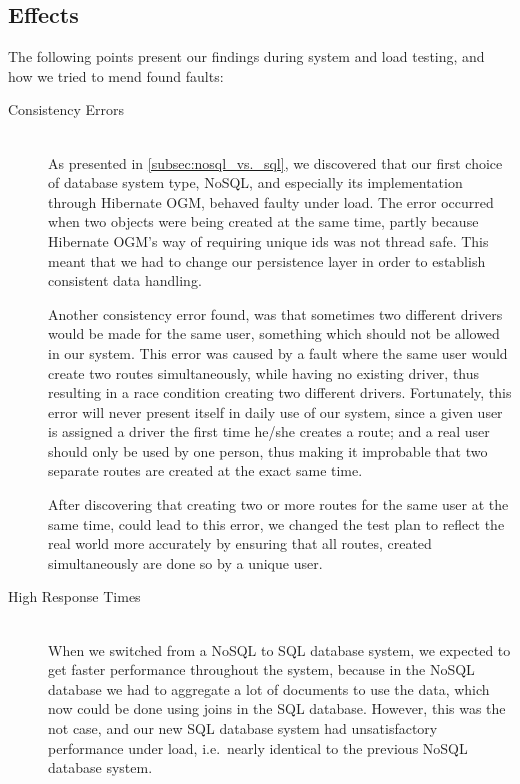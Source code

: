 \subsection{Effects}
The following points present our findings during system and load testing, and how we tried to mend found faults:
\begin{description}
    \item[Consistency Errors]\hfill \\
        As presented in \cref{subsec:nosql_vs._sql}, we discovered that our first choice of database system type, NoSQL, and especially its implementation through Hibernate OGM, behaved faulty under load.
        The error occurred when two objects were being created at the same time, partly because Hibernate OGM's way of requiring unique ids was not thread safe.
        This meant that we had to change our persistence layer in order to establish consistent data handling.

        Another consistency error found, was that sometimes two different drivers would be made for the same user, something which should not be allowed in our system.
        This error was caused by a fault where the same user would create two routes simultaneously, while having no existing driver, thus resulting in a race condition creating two different drivers.
        Fortunately, this error will never present itself in daily use of our system, since a given user is assigned a driver the first time he/she creates a route;
        and a real user should only be used by one person, thus making it improbable that two separate routes are created at the exact same time.

        After discovering that creating two or more routes for the same user at the same time, could lead to this error, we changed the test plan to reflect the real world more accurately by ensuring that all routes, created simultaneously are done so by a unique user.
    \item[High Response Times]\hfill \\
        When we switched from a NoSQL to SQL database system, we expected to get faster performance throughout the system, because in the NoSQL database we had to aggregate a lot of documents to use the data, which now could be done using joins in the SQL database.
        However, this was the not case, and our new SQL database system had unsatisfactory performance under load, i.e.~nearly identical to the previous NoSQL database system.


\end{description}
